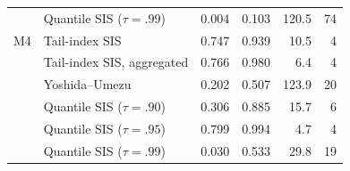 \begin{table}[t]
\begin{tabular}{llrrrr}
 & Quantile SIS ($\tau=.99$) & 0.004 & 0.103 & 120.5 & 74\\
\addlinespace
M4 & Tail-index SIS & 0.747 & 0.939 & 10.5 & 4\\
 & Tail-index SIS, aggregated & 0.766 & 0.980 & 6.4 & 4\\
 & Yoshida--Umezu & 0.202 & 0.507 & 123.9 & 20\\
 & Quantile SIS ($\tau=.90$) & 0.306 & 0.885 & 15.7 & 6\\
 & Quantile SIS ($\tau=.95$) & 0.799 & 0.994 & 4.7 & 4\\
 & Quantile SIS ($\tau=.99$) & 0.030 & 0.533 & 29.8 & 19\\
\bottomrule
\end{tabular}
\end{table}
